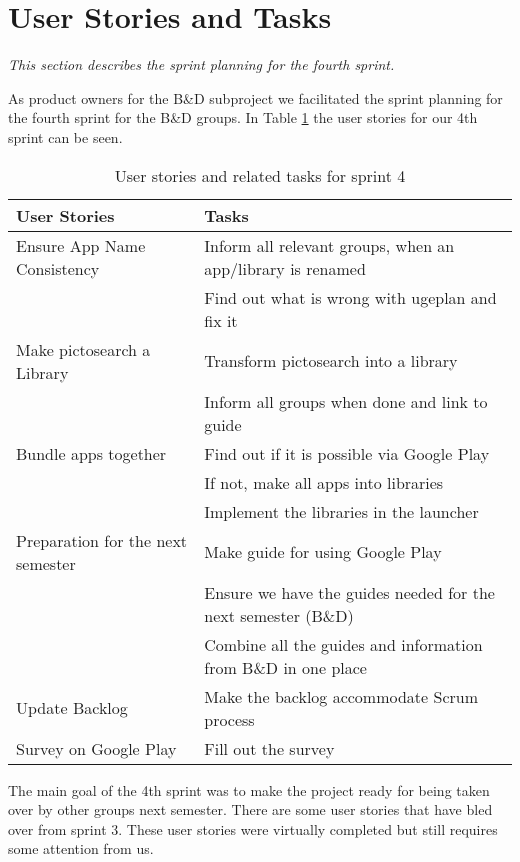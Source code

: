 \section{User Stories and Tasks} \label{Sprint4_SecUserStoriesAndTasks}
\textit{This section describes the sprint planning for the fourth sprint.}

As product owners for the B\&D subproject we facilitated the sprint planning for the fourth sprint for the B\&D groups. In Table \ref{Sprint4_UserStories4_table} the user stories for our 4th sprint can be seen.

\begin{table} [H]
	\centering
	\begin{tabular}{ll}
		\textbf{User Stories} & \textbf{Tasks}\\ \hline \noalign{\vskip 2mm}
		Ensure App Name Consistency & Inform all relevant groups, when an app/library is renamed\\ 
		& Find out what is wrong with ugeplan and fix it\\ \hline
		Make pictosearch a Library & Transform pictosearch into a library\\
		& Inform all groups when done and link to guide\\ \hline
		Bundle apps together & Find out if it is possible via Google Play\\
		& If not, make all apps into libraries\\
		& Implement the libraries in the launcher\\ \hline
		Preparation for the next semester & Make guide for using Google Play\\
		& Ensure we have the guides needed for the next semester (B\&D)\\
		& Combine all the guides and information from B\&D in one place\\ \hline
		Update Backlog & Make the backlog accommodate Scrum process\\ \hline
		Survey on Google Play & Fill out the survey\\ \hline
	\end{tabular}
	\caption{User stories and related tasks for sprint 4}
	\label{Sprint4_UserStories4_table}
\end{table}

The main goal of the 4th sprint was to make the project ready for being taken over by other groups next semester.
There are some user stories that have bled over from sprint 3. These user stories were virtually completed but still requires some attention from us.\\
\newpage